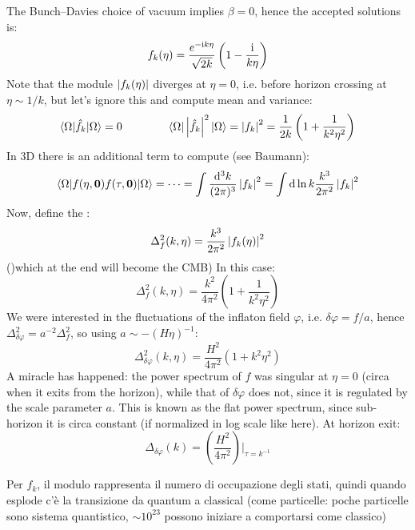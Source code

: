 The Bunch--Davies choice of vacuum implies $ \beta = 0 $, hence the accepted solutions is:
\begin{equation}
  f_k(\eta) = \frac{e^{-\mathrm{i} k \eta}}{\sqrt{2k}} \left( 1 - \frac{\mathrm{i}}{k \eta} \right)
\end{equation}
Note that the module $ \left\lvert f_k(\eta)\right\rvert $ diverges at $ \eta = 0 $, i.e. before horizon crossing at $ \eta \sim 1 / k $, but let's ignore this and compute mean and variance:
\begin{equation*}
  \braket{\Omega | \hat{f}_k | \Omega} = 0
  \qquad \qquad
  \braket{\Omega | \left\lvert\hat{f}_k\right\rvert^2 | \Omega} = \left\lvert f_k\right\rvert^2 = \frac{1}{2k} \left( 1 + \frac{1}{k^2 \eta^2} \right)
\end{equation*}
In 3D there is an additional term to compute (see Baumann):
\begin{equation*}
  \braket{\Omega | f(\eta , \mathbf{0}) f(\tau , \mathbf{0}) | \Omega} = \dots = \int \frac{\mathrm{d}^3k}{(2\pi)^3} \left\lvert f_k\right\rvert^2 = \int \mathrm{d} \ln k \frac{k^3}{2\pi^2} \left\lvert f_k\right\rvert^2
\end{equation*}
Now, define the :
\begin{equation}
  \Delta_f^2(k,\eta) = \frac{k^3}{2\pi^2} \left\lvert f_k(\eta)\right\rvert^2
\end{equation}
()which at the end will become the CMB) In this case:
\begin{equation*}
  \Delta_f^2(k,\eta) = \frac{k^2}{4\pi^2} \left( 1 + \frac{1}{k^2 \eta^2} \right)
\end{equation*}
We were interested in the fluctuations of the inflaton field $ \varphi $, i.e. $ \delta \varphi = f / a $, hence $ \Delta_{\delta \varphi}^2 = a^{-2} \Delta_f^2 $, so using $ a \sim - (H \eta)^{-1} $:
\begin{equation}
  \Delta_{\delta \varphi}^2(k , \eta) = \frac{H^2}{4\pi^2} (1 + k^2 \eta^2)
\end{equation}
A miracle has happened: the power spectrum of $ f $ was singular at $ \eta = 0 $ (circa when it exits from the horizon), while that of $ \delta \varphi $ does not, since it is regulated by the scale parameter $ a $. This is known as the flat power spectrum, since sub-horizon it is circa constant (if normalized in log scale like here). At horizon exit:
\begin{equation*}
  \Delta_{\delta \varphi}(k) = \left( \frac{H^2}{4\pi^2} \right) \bigg\vert_{\tau = k^{-1}}
\end{equation*}

Per $ f_k $, il modulo rappresenta il numero di occupazione degli stati, quindi quando esplode c'è la transizione da quantum a classical (come particelle: poche particelle sono sistema quantistico, $ \sim 10^23 $ possono iniziare a comportarsi come classico)

